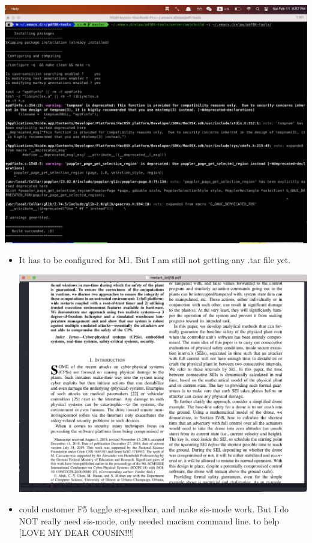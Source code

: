 \documentclass[9pt, b5paper]{article}
\begin{document}
\begin{center}
\includegraphics[width=.9\linewidth]{./pic/Snipaste_2023-02-11_20-57-40.png}
\end{center}
\begin{itemize}
\item It has to be configured for M1. But I am still not getting any .tar file yet. 

\begin{center}
\includegraphics[width=.9\linewidth]{./pic/Snipaste_2023-02-11_22-20-25.png}
\end{center}
\item could customer F5 toggle sr-speedbar, and make sis-mode work. But I do NOT really need sis-mode, only needed macism command line. to help [LOVE MY DEAR COUSIN!!!]
\end{itemize}
\end{document}
